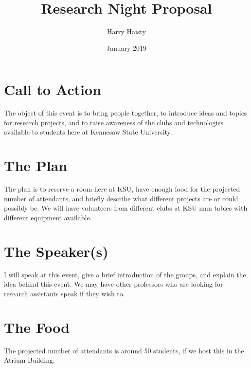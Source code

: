 \documentclass{article}
\title{Research Night Proposal}
\author{Harry Haisty}
\date{January 2019}
\begin{document}
\maketitle

\section*{Call to Action}
The object of this event is to bring people together, to introduce ideas and topics for research projects, and to raise awareness of the clubs and technologies available to students here at Kennesaw State University. 

\section*{The Plan}
The plan is to reserve a room here at KSU, have enough food for the projected number of attendants, and briefly describe what different projects are or could possibly be. We will have volunteers from different clubs at KSU man tables with different equipment available. 

\section*{The Speaker(s)}
I will speak at this event, give a brief introduction of the groups, and explain the idea behind this event. We may have other professors who are looking for research assistants speak if they wish to. 

\section*{The Food}
The projected number of attendants is around 50 students, if we host this in the Atrium Building. 
\end{document}
